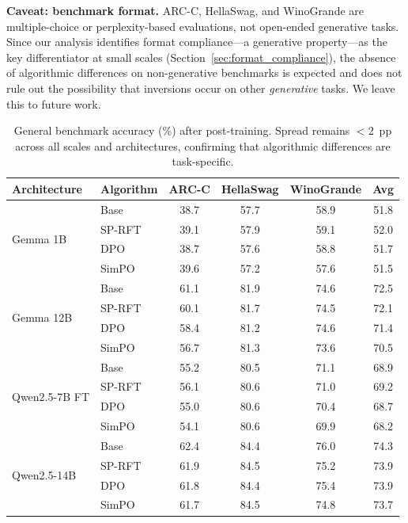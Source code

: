 \documentclass{article}
\newcommand{\sprft}{SP-RFT}
\begin{document}
\textbf{Caveat: benchmark format.} ARC-C, HellaSwag, and WinoGrande are multiple-choice or perplexity-based evaluations, not open-ended generative tasks. Since our analysis identifies format compliance---a generative property---as the key differentiator at small scales (Section~\ref{sec:format_compliance}), the absence of algorithmic differences on non-generative benchmarks is expected and does not rule out the possibility that inversions occur on other \emph{generative} tasks. We leave this to future work.

\begin{table}[ht]
\centering
\caption{General benchmark accuracy (\%) after post-training. Spread remains $<$2~pp across all scales and architectures, confirming that algorithmic differences are task-specific.}
\label{tab:general_benchmarks}
\small
\begin{tabular}{@{}llcccc@{}}
\toprule
\textbf{Architecture} & \textbf{Algorithm} & \textbf{ARC-C} & \textbf{HellaSwag} & \textbf{WinoGrande} & \textbf{Avg} \\
\midrule
\multirow{4}{*}{Gemma 1B} & Base & 38.7 & 57.7 & 58.9 & 51.8 \\
& \sprft{} & 39.1 & 57.9 & 59.1 & 52.0 \\
& DPO & 38.7 & 57.6 & 58.8 & 51.7 \\
& SimPO & 39.6 & 57.2 & 57.6 & 51.5 \\
\midrule
\multirow{4}{*}{Gemma 12B} & Base & 61.1 & 81.9 & 74.6 & 72.5 \\
& \sprft{} & 60.1 & 81.7 & 74.5 & 72.1 \\
& DPO & 58.4 & 81.2 & 74.6 & 71.4 \\
& SimPO & 56.7 & 81.3 & 73.6 & 70.5 \\
\midrule
\multirow{4}{*}{Qwen2.5-7B FT} & Base & 55.2 & 80.5 & 71.1 & 68.9 \\
& \sprft{} & 56.1 & 80.6 & 71.0 & 69.2 \\
& DPO & 55.0 & 80.6 & 70.4 & 68.7 \\
& SimPO & 54.1 & 80.6 & 69.9 & 68.2 \\
\midrule
\multirow{4}{*}{Qwen2.5-14B} & Base & 62.4 & 84.4 & 76.0 & 74.3 \\
& \sprft{} & 61.9 & 84.5 & 75.2 & 73.9 \\
& DPO & 61.8 & 84.4 & 75.4 & 73.9 \\
& SimPO & 61.7 & 84.5 & 74.8 & 73.7 \\
\bottomrule
\end{tabular}
\end{table}
\end{document}
